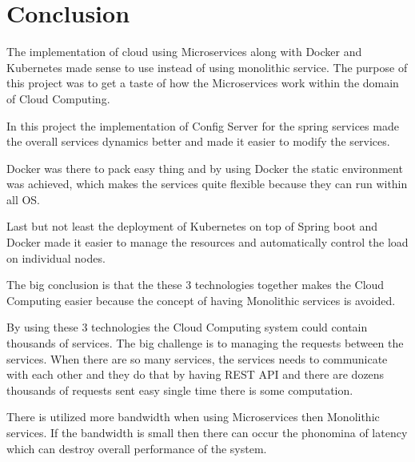 \chapter{Conclusion}\label{ch:conclusion}

The implementation of cloud using Microservices along with Docker and Kubernetes made sense to use instead of using monolithic service. The purpose of this project was to get a taste of how the Microservices work within the domain of Cloud Computing. 

In this project the implementation of Config Server for the spring services made the overall services dynamics better and made it easier to modify the services. 

Docker was there to pack easy thing and by using Docker the static environment was achieved, which makes the services quite flexible because they can run within all OS. 

Last but not least the deployment of Kubernetes on top of Spring boot and Docker made it easier to manage the resources and automatically control the load on individual nodes. 

The big conclusion is that the these 3 technologies together makes the Cloud Computing easier because the concept of having Monolithic services is avoided. 

By using these 3 technologies the Cloud Computing system could contain thousands of services. The big challenge is to managing the requests between the services. When there are so many services, the services needs to communicate with each other and they do that by having REST API and there are dozens thousands of requests sent easy single time there is some computation. 

There is utilized more bandwidth when using Microservices then Monolithic services. If the bandwidth is small then there can occur the phonomina of latency which can destroy overall performance of the system. 